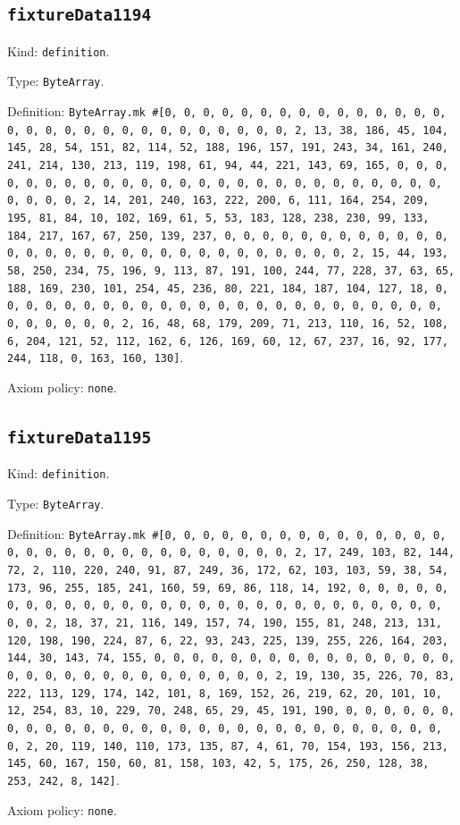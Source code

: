 \documentclass[11pt]{article}
\begin{document}
\subsection*{\texttt{fixtureData1194}}
\noindent Kind: \texttt{definition}.\par
\noindent Type: \texttt{ByteArray}.\par
\noindent Definition: \texttt{ByteArray.mk \#[0, 0, 0, 0, 0, 0, 0, 0, 0, 0, 0, 0, 0, 0, 0, 0, 0, 0, 0, 0, 0, 0, 0, 0, 0, 0, 0, 0, 0, 0, 2, 13, 38, 186, 45, 104, 145, 28, 54, 151, 82, 114, 52, 188, 196, 157, 191, 243, 34, 161, 240, 241, 214, 130, 213, 119, 198, 61, 94, 44, 221, 143, 69, 165, 0, 0, 0, 0, 0, 0, 0, 0, 0, 0, 0, 0, 0, 0, 0, 0, 0, 0, 0, 0, 0, 0, 0, 0, 0, 0, 0, 0, 0, 0, 2, 14, 201, 240, 163, 222, 200, 6, 111, 164, 254, 209, 195, 81, 84, 10, 102, 169, 61, 5, 53, 183, 128, 238, 230, 99, 133, 184, 217, 167, 67, 250, 139, 237, 0, 0, 0, 0, 0, 0, 0, 0, 0, 0, 0, 0, 0, 0, 0, 0, 0, 0, 0, 0, 0, 0, 0, 0, 0, 0, 0, 0, 0, 0, 2, 15, 44, 193, 58, 250, 234, 75, 196, 9, 113, 87, 191, 100, 244, 77, 228, 37, 63, 65, 188, 169, 230, 101, 254, 45, 236, 80, 221, 184, 187, 104, 127, 18, 0, 0, 0, 0, 0, 0, 0, 0, 0, 0, 0, 0, 0, 0, 0, 0, 0, 0, 0, 0, 0, 0, 0, 0, 0, 0, 0, 0, 0, 0, 2, 16, 48, 68, 179, 209, 71, 213, 110, 16, 52, 108, 6, 204, 121, 52, 112, 162, 6, 126, 169, 60, 12, 67, 237, 16, 92, 177, 244, 118, 0, 163, 160, 130]}.\par
\noindent Axiom policy: \texttt{none}.\par
\subsection*{\texttt{fixtureData1195}}
\noindent Kind: \texttt{definition}.\par
\noindent Type: \texttt{ByteArray}.\par
\noindent Definition: \texttt{ByteArray.mk \#[0, 0, 0, 0, 0, 0, 0, 0, 0, 0, 0, 0, 0, 0, 0, 0, 0, 0, 0, 0, 0, 0, 0, 0, 0, 0, 0, 0, 0, 0, 2, 17, 249, 103, 82, 144, 72, 2, 110, 220, 240, 91, 87, 249, 36, 172, 62, 103, 103, 59, 38, 54, 173, 96, 255, 185, 241, 160, 59, 69, 86, 118, 14, 192, 0, 0, 0, 0, 0, 0, 0, 0, 0, 0, 0, 0, 0, 0, 0, 0, 0, 0, 0, 0, 0, 0, 0, 0, 0, 0, 0, 0, 0, 0, 2, 18, 37, 21, 116, 149, 157, 74, 190, 155, 81, 248, 213, 131, 120, 198, 190, 224, 87, 6, 22, 93, 243, 225, 139, 255, 226, 164, 203, 144, 30, 143, 74, 155, 0, 0, 0, 0, 0, 0, 0, 0, 0, 0, 0, 0, 0, 0, 0, 0, 0, 0, 0, 0, 0, 0, 0, 0, 0, 0, 0, 0, 0, 0, 2, 19, 130, 35, 226, 70, 83, 222, 113, 129, 174, 142, 101, 8, 169, 152, 26, 219, 62, 20, 101, 10, 12, 254, 83, 10, 229, 70, 248, 65, 29, 45, 191, 190, 0, 0, 0, 0, 0, 0, 0, 0, 0, 0, 0, 0, 0, 0, 0, 0, 0, 0, 0, 0, 0, 0, 0, 0, 0, 0, 0, 0, 0, 0, 2, 20, 119, 140, 110, 173, 135, 87, 4, 61, 70, 154, 193, 156, 213, 145, 60, 167, 150, 60, 81, 158, 103, 42, 5, 175, 26, 250, 128, 38, 253, 242, 8, 142]}.\par
\noindent Axiom policy: \texttt{none}.\par
\end{document}
